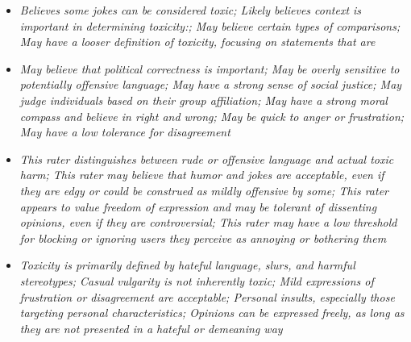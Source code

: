 \documentclass[11pt]{article}
\newcommand{\profiletext}[1]{\textit{#1}}
\begin{document}
\begin{itemize}
\item \profiletext{Believes some jokes can be considered toxic; Likely believes context is important in determining toxicity:; May believe certain types of comparisons; May have a looser definition of toxicity, focusing on statements that are}
\item \profiletext{May believe that political correctness is important; May be overly sensitive to potentially offensive language; May have a strong sense of social justice; May judge individuals based on their group affiliation; May have a strong moral compass and believe in right and wrong; May be quick to anger or frustration; May have a low tolerance for disagreement}
\item \profiletext{This rater distinguishes between rude or offensive language and actual toxic harm; This rater may believe that humor and jokes are acceptable, even if they are edgy or could be construed as mildly offensive by some; This rater appears to value freedom of expression and may be tolerant of dissenting opinions, even if they are controversial; This rater may have a low threshold for blocking or ignoring users they perceive as annoying or bothering them}
\item \profiletext{Toxicity is primarily defined by hateful language, slurs, and harmful stereotypes; Casual vulgarity is not inherently toxic; Mild expressions of frustration or disagreement are acceptable; Personal insults, especially those targeting personal characteristics; Opinions can be expressed freely, as long as they are not presented in a hateful or demeaning way}
\end{itemize}
\end{document}
